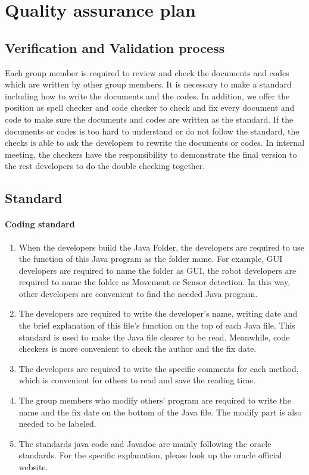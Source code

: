 \documentclass[11pt, a4paper]{report}
\begin{document}
\section{Quality assurance plan}
\subsection{Verification and Validation process}
Each group member is required to review and check the documents and codes which are written by other group members. It is necessary to make a standard including how to write the documents and the codes. In addition, we offer the position as spell checker and code checker to check and fix every document and code to make sure the documents and codes are written as the standard. If the documents or codes is too hard to understand or do not follow the standard, the checks is able to ask the developers to rewrite the documents or codes. In internal meeting, the checkers have the responsibility to demonstrate the final version to the rest developers to do the double checking together.
\subsection{Standard}
\paragraph{Coding standard}

\begin{enumerate}
	\item When the developers build the Java Folder, the developers are required to use the function of this Java program as the folder name. For example, GUI developers are required to name the folder as GUI, the robot developers are required to name the folder as Movement or Sensor detection. In this way, other developers are convenient to find the needed Java program.
	\item The developers are required to write the developer's name, writing date and the brief explanation of this file's function on the top of each Java file. This standard is used to make the Java file clearer to be read. Meanwhile, code checkers is more convenient to check the author and the fix date.  
	\item The developers are required to write the specific comments for each method, which is convenient for others to read and save the reading time.
	\item The group members who modify others' program are required to write the name and the fix date on the bottom of the Java file. The modify part is also needed to be labeled.
	\item The standards java code and Javadoc are mainly following the oracle standards. For the specific explanation, please look up the oracle official website.
\end{enumerate}
\end{document}
